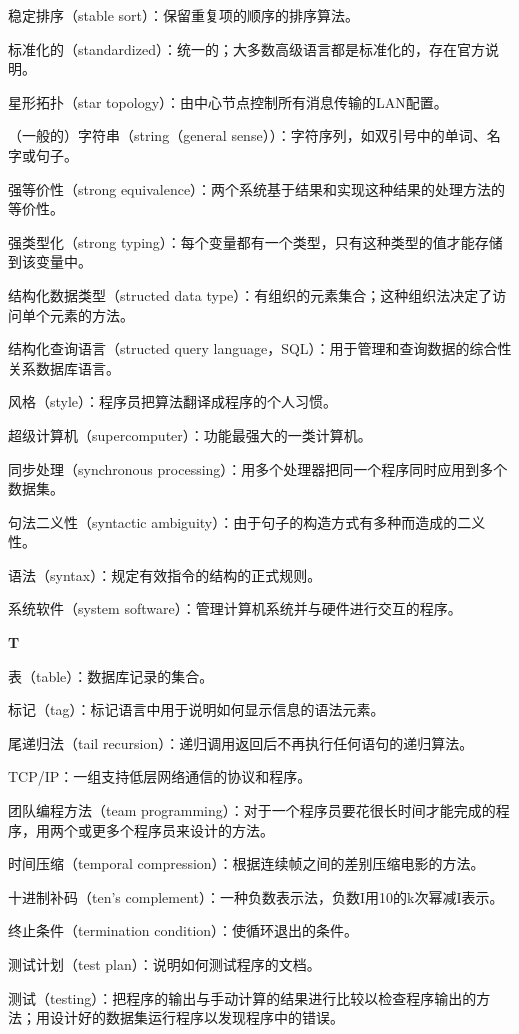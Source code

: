 稳定排序（stable sort）：保留重复项的顺序的排序算法。

标准化的（standardized）：统一的；大多数高级语言都是标准化的，存在官方说明。

星形拓扑（star topology）：由中心节点控制所有消息传输的LAN配置。

（一般的）字符串（string（general sense））：字符序列，如双引号中的单词、名字或句子。

强等价性（strong equivalence）：两个系统基于结果和实现这种结果的处理方法的等价性。

强类型化（strong typing）：每个变量都有一个类型，只有这种类型的值才能存储到该变量中。

结构化数据类型（structed data type）：有组织的元素集合；这种组织法决定了访问单个元素的方法。

结构化查询语言（structed query language，SQL）：用于管理和查询数据的综合性关系数据库语言。

风格（style）：程序员把算法翻译成程序的个人习惯。

超级计算机（supercomputer）：功能最强大的一类计算机。

同步处理（synchronous processing）：用多个处理器把同一个程序同时应用到多个数据集。

句法二义性（syntactic ambiguity）：由于句子的构造方式有多种而造成的二义性。

语法（syntax）：规定有效指令的结构的正式规则。

系统软件（system software）：管理计算机系统并与硬件进行交互的程序。

\textbf{T}

表（table）：数据库记录的集合。

标记（tag）：标记语言中用于说明如何显示信息的语法元素。

尾递归法（tail recursion）：递归调用返回后不再执行任何语句的递归算法。

TCP/IP：一组支持低层网络通信的协议和程序。

团队编程方法（team programming）：对于一个程序员要花很长时间才能完成的程序，用两个或更多个程序员来设计的方法。

时间压缩（temporal compression）：根据连续帧之间的差别压缩电影的方法。

十进制补码（ten’s complement）：一种负数表示法，负数I用10的k次幂减I表示。

终止条件（termination condition）：使循环退出的条件。

测试计划（test plan）：说明如何测试程序的文档。

测试（testing）：把程序的输出与手动计算的结果进行比较以检查程序输出的方法；用设计好的数据集运行程序以发现程序中的错误。

